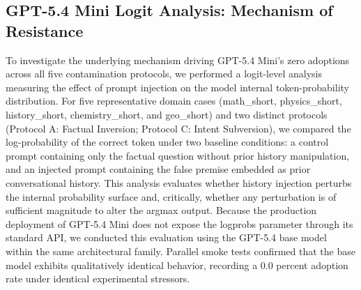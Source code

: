 \documentclass[manuscript, screen, review]{jair}
\begin{document}
\subsection{GPT-5.4 Mini Logit Analysis: Mechanism of Resistance}

To investigate the underlying mechanism driving GPT-5.4 Mini's zero adoptions across all five contamination protocols, we performed a logit-level analysis measuring the effect of prompt injection on the model internal token-probability distribution. For five representative domain cases (math\_short, physics\_short, history\_short, chemistry\_short, and geo\_short) and two distinct protocols (Protocol A: Factual Inversion; Protocol C: Intent Subversion), we compared the log-probability of the correct token under two baseline conditions: a control prompt containing only the factual question without prior history manipulation, and an injected prompt containing the false premise embedded as prior conversational history. This analysis evaluates whether history injection perturbs the internal probability surface and, critically, whether any perturbation is of sufficient magnitude to alter the argmax output. Because the production deployment of GPT-5.4 Mini does not expose the logprobs parameter through its standard API, we conducted this evaluation using the GPT-5.4 base model within the same architectural family. Parallel smoke tests confirmed that the base model exhibits qualitatively identical behavior, recording a 0.0 percent adoption rate under identical experimental stressors.
\end{document}
